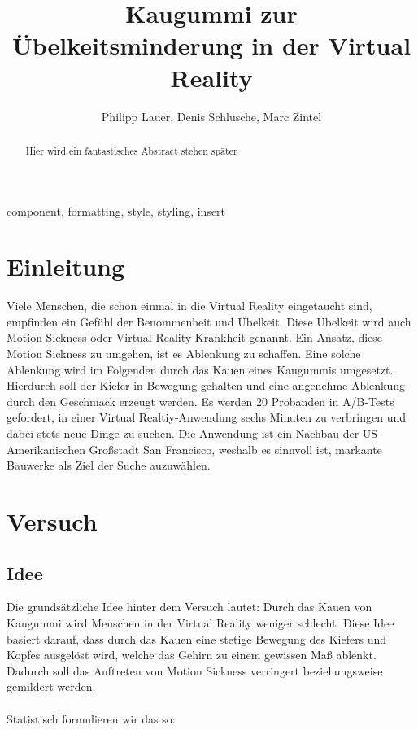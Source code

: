 \documentclass[conference]{IEEEtran}
\begin{document}
\title{Kaugummi zur Übelkeitsminderung in der Virtual Reality\\}

\author{Philipp Lauer, Denis Schlusche, Marc Zintel}

\maketitle

\begin{abstract}
Hier wird ein fantastisches Abstract stehen später
\end{abstract}

\begin{IEEEkeywords}
component, formatting, style, styling, insert
\end{IEEEkeywords}

\section{Einleitung}
Viele Menschen, die schon einmal in die Virtual Reality eingetaucht sind, empfinden ein Gefühl der Benommenheit und Übelkeit. Diese Übelkeit wird auch Motion Sickness oder Virtual Reality Krankheit genannt. Ein Ansatz, diese Motion Sickness zu umgehen, ist es Ablenkung zu schaffen. Eine solche Ablenkung wird im Folgenden durch das Kauen eines Kaugummis umgesetzt. Hierdurch soll der Kiefer in Bewegung gehalten und eine angenehme Ablenkung durch den Geschmack erzeugt werden. Es werden 20 Probanden in A/B-Tests gefordert, in einer Virtual Realtiy-Anwendung sechs Minuten zu verbringen und dabei stets neue Dinge zu suchen. Die Anwendung ist ein Nachbau der US-Amerikanischen Großstadt San Francisco, weshalb es sinnvoll ist, markante Bauwerke als Ziel der Suche auzuwählen. 

\section{Versuch}
\subsection{Idee}
Die grundsätzliche Idee hinter dem Versuch lautet: Durch das Kauen von Kaugummi wird Menschen in der Virtual Reality weniger schlecht.
Diese Idee basiert darauf, dass durch das Kauen eine stetige Bewegung des Kiefers und Kopfes ausgelöst wird, welche das Gehirn zu einem gewissen Maß ablenkt. Dadurch soll das Auftreten von Motion Sickness verringert beziehungsweise gemildert werden. 
\\
\\
Statistisch formulieren wir das so:
\end{document}
